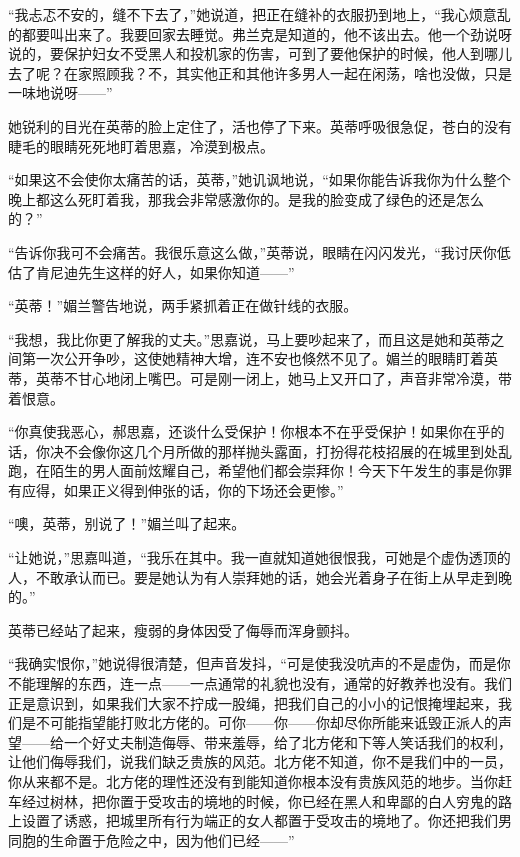 \par “我忐忑不安的，缝不下去了，”她说道，把正在缝补的衣服扔到地上，“我心烦意乱的都要叫出来了。我要回家去睡觉。弗兰克是知道的，他不该出去。他一个劲说呀说的，要保护妇女不受黑人和投机家的伤害，可到了要他保护的时候，他人到哪儿去了呢？在家照顾我？不，其实他正和其他许多男人一起在闲荡，啥也没做，只是一味地说呀——”
\par 她锐利的目光在英蒂的脸上定住了，活也停了下来。英蒂呼吸很急促，苍白的没有睫毛的眼睛死死地盯着思嘉，冷漠到极点。
\par “如果这不会使你太痛苦的话，英蒂，”她讥讽地说，“如果你能告诉我你为什么整个晚上都这么死盯着我，那我会非常感激你的。是我的脸变成了绿色的还是怎么的？”
\par “告诉你我可不会痛苦。我很乐意这么做，”英蒂说，眼睛在闪闪发光，“我讨厌你低估了肯尼迪先生这样的好人，如果你知道——”
\par “英蒂！”媚兰警告地说，两手紧抓着正在做针线的衣服。
\par “我想，我比你更了解我的丈夫。”思嘉说，马上要吵起来了，而且这是她和英蒂之间第一次公开争吵，这使她精神大增，连不安也倏然不见了。媚兰的眼睛盯着英蒂，英蒂不甘心地闭上嘴巴。可是刚一闭上，她马上又开口了，声音非常冷漠，带着恨意。
\par “你真使我恶心，郝思嘉，还谈什么受保护！你根本不在乎受保护！如果你在乎的话，你决不会像你这几个月所做的那样抛头露面，打扮得花枝招展的在城里到处乱跑，在陌生的男人面前炫耀自己，希望他们都会崇拜你！今天下午发生的事是你罪有应得，如果正义得到伸张的话，你的下场还会更惨。”
\par “噢，英蒂，别说了！”媚兰叫了起来。
\par “让她说，”思嘉叫道，“我乐在其中。我一直就知道她很恨我，可她是个虚伪透顶的人，不敢承认而已。要是她认为有人崇拜她的话，她会光着身子在街上从早走到晚的。”
\par 英蒂已经站了起来，瘦弱的身体因受了侮辱而浑身颤抖。
\par “我确实恨你，”她说得很清楚，但声音发抖，“可是使我没吭声的不是虚伪，而是你不能理解的东西，连一点——一点通常的礼貌也没有，通常的好教养也没有。我们正是意识到，如果我们大家不拧成一股绳，把我们自己的小小的记恨掩埋起来，我们是不可能指望能打败北方佬的。可你——你——你却尽你所能来诋毁正派人的声望——给一个好丈夫制造侮辱、带来羞辱，给了北方佬和下等人笑话我们的权利，让他们侮辱我们，说我们缺乏贵族的风范。北方佬不知道，你不是我们中的一员，你从来都不是。北方佬的理性还没有到能知道你根本没有贵族风范的地步。当你赶车经过树林，把你置于受攻击的境地的时候，你已经在黑人和卑鄙的白人穷鬼的路上设置了诱惑，把城里所有行为端正的女人都置于受攻击的境地了。你还把我们男同胞的生命置于危险之中，因为他们已经——”
